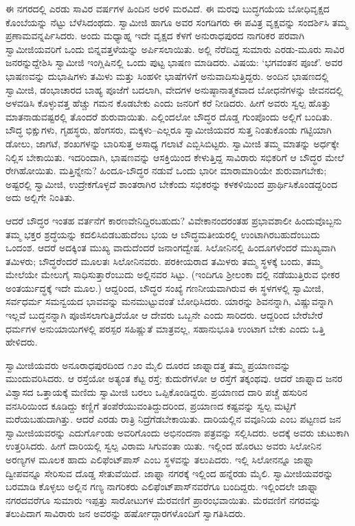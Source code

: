 ಈ ನಗರದಲ್ಲಿ ಎರಡು ಸಾವಿರ ವರ್ಷಗಳ ಹಿಂದಿನ ಅರಳಿ ಮರವಿದೆ. ಈ ಮರವು ಬುದ್ಧಗಯೆಯ ಬೋಧಿವೃಕ್ಷದ ಕೊಂಬೆಯನ್ನು ನೆಟ್ಟು ಬೆಳೆಸಿದಂಥದು. ಸ್ವಾಮೀಜಿ ಹಾಗೂ ಅವರ ಸಂಗಡಿಗರು ಈ ಪವಿತ್ರ ವೃಕ್ಷವನ್ನು ಸಂದರ್ಶಿಸಿ ತಮ್ಮ ಪ್ರಣಾಮವನ್ನರ್ಪಿಸಿದರು. ಅಂದು ಮಧ್ಯಾಹ್ನ ಇದೇ ವೃಕ್ಷದ ಕೆಳಗೆ ಅನುರಾಧಪುರದ ನಾಗರಿಕರ ಪರವಾಗಿ ಸ್ವಾಮೀಜಿಯವರಿಗೆ ಒಂದು ಬಿನ್ನವತ್ತಳೆಯನ್ನು ಅರ್ಪಿಸಲಾಯಿತು. ಅಲ್ಲಿ ನೆರೆದಿದ್ದ ಸುಮಾರು ಎರಡು-ಮೂರು ಸಾವಿರ ಜನರನ್ನುದ್ದೇಶಿಸಿ ಸ್ವಾಮೀಜಿ ಇಂಗ್ಲಿಷಿನಲ್ಲಿ ಒಂದು ಪುಟ್ಟ ಭಾಷಣ ಮಾಡಿದರು. ವಿಷಯ: ‘ಭಗವಂತನ ಪೂಜೆ’. ಅವರ ಭಾಷಣವನ್ನು ದುಭಾಷಿಗಳು ತಮಿಳು ಮತ್ತು ಸಿಂಹಳೀ ಭಾಷೆಗಳಿಗೆ ಅನುವಾದಿಸುತ್ತಿದ್ದರು. ಅಂದಿನ ಭಾಷಣದಲ್ಲಿ ಸ್ವಾಮೀಜಿ, ಡಂಭಾಚಾರದ ಬಾಹ್ಯ ಪೂಜೆಗೆ ಬದಲಾಗಿ, ವೇದಗಳ ಅನುಷ್ಠಾನಾತ್ಮಕವಾದ ಬೋಧನೆಗಳನ್ನು ಜೀವನದಲ್ಲಿ ಅಳವಡಿಸಿ ಕೊಳ್ಳುವತ್ತ ಹೆಚ್ಚು ಗಮನ ಕೊಡಬೇಕು ಎಂದು ಜನರಿಗೆ ಕರೆ ನೀಡಿದರು. ಹೀಗೆ ಅವರು ಸ್ವಲ್ಪ ಹೊತ್ತು ಮಾತನಾಡುವಷ್ಟರಲ್ಲಿ ತೊಂದರೆ ಶುರುವಾಯಿತು. ಎಲ್ಲಿಂದಲೋ ಬೌದ್ಧರ ದೊಡ್ಡ ಗುಂಪೊಂದು ಅಲ್ಲಿಗೆ ಬಂದಿತು. ಬೌದ್ಧ ಭಿಕ್ಷುಗಳು, ಗೃಹಸ್ಥರು, ಹೆಂಗಸರು, ಮಕ್ಕಳು–ಎಲ್ಲರೂ ಸ್ವಾಮೀಜಿಯವರ ಸುತ್ತ ನಿಂತುಕೊಂಡು ಗಟ್ಟಿಯಾಗಿ ಡೋಲು, ಜಾಗಟೆ, ಶಂಖಗಳನ್ನು ಬಾರಿಸುತ್ತ ಅಸಾಧ್ಯ ಗಲಾಟೆ ಎಬ್ಬಿಸಿಬಿಟ್ಟರು. ಸ್ವಾಮೀಜಿ ತಮ್ಮ ಮಾತನ್ನು ಅರ್ಧಕ್ಕೇ ನಿಲ್ಲಿಸ ಬೇಕಾಯಿತು. ಇದರಿಂದಾಗಿ, ಭಾಷಣವನ್ನು ಆಸಕ್ತಿಯಿಂದ ಕೇಳುತ್ತಿದ್ದ ಸಾವಿರಾರು ಸಭಿಕರಿಗೆ ಆ ಬೌದ್ಧರ ಮೇಲೆ ರೇಗಿಹೋಯಿತು. ಮತ್ತಿನ್ನೇನು? ಹಿಂದೂ-ಬೌದ್ಧರ ನಡುವೆ ಒಂದು ಭಾರೀ ಮಾರಾಮಾರಿಯೇ ಶುರುವಾಗಬೇಕು; ಅಷ್ಟರಲ್ಲಿ ಸ್ವಾಮೀಜಿ, ಉದ್ರೇಕಗೊಳ್ಳದೆ ಶಾಂತರಾಗಿರ ಬೇಕೆಂದು ಸಭಿಕರನ್ನು ಕಳಕಳಿಯಿಂದ ಪ್ರಾರ್ಥಿಸಿಕೊಂಡದ್ದರಿಂದ ಅದು ಅಲ್ಲಿಗೇ ನಿಂತಿತು. 

ಆದರೆ ಬೌದ್ಧರ ಇಂತಹ ವರ್ತನೆಗೆ ಕಾರಣವೇನಿದ್ದಿರಬಹುದು? ವಿವೇಕಾನಂದರಂತಹ ಪ್ರಭಾವಶಾಲೀ ಹಿಂದುವೊಬ್ಬನು ತಮ್ಮ ಭಕ್ತರ ಶ್ರದ್ಧೆಯನ್ನು ಕದಲಿಸಿಬಿಡಬಹುದೆಂಬ ಭಯ ಆ ಬೌದ್ಧಮತೀಯರಲ್ಲಿ ಉಂಟಾಗಿರಬಹುದೆಂಬುದು ಒಂದಂಶ. ಆದರೆ ಅದಕ್ಕಿಂತ ಮುಖ್ಯ ವಾದುದೆಂದರೆ ಜನಾಂಗದ್ವೇಷ. ಸಿಲೋನಿನಲ್ಲಿ ಹಿಂದೂಗಳೆಂದರೆ ಮುಖ್ಯವಾಗಿ ತಮಿಳರು; ಬೌದ್ಧರೆಂದರೆ ಮೂಲತಃ ಸಿಲೋನಿನವರು. ಪರಕೀಯರಾದ ತಮಿಳರು ತಮ್ಮ ಸ್ಥಳಕ್ಕೆ ಬಂದು, ತಮ್ಮ ಮೇಲೆಯೇ ಮೇಲುಗೈ ಸಾಧಿಸುತ್ತಾರೆಂಬುದು ಅಲ್ಲಿನವರ ಸಿಟ್ಟು. (ಇಂದಿಗೂ ಶ್ರೀಲಂಕಾ ದಲ್ಲಿ ನಡೆಯುತ್ತಿರುವ ಭೀಕರ ಅಂತರ್ಯುದ್ಧಕ್ಕೆ ಇದೇ ಮೂಲ.) ಆದ್ದರಿಂದ, ಬೌದ್ಧರ ಸಂಖ್ಯೆ ಗಣನೀಯವಾಗಿರುವ ಈ ಸ್ಥಳಗಳಲ್ಲಿ ಸ್ವಾಮೀಜಿ, ಸರ್ವಧರ್ಮ ಸಮನ್ವಯದ ಭಾವವನ್ನು ಮನಮುಟ್ಟುವಂತೆ ಬೋಧಿಸಿದರು. ಯಾರನ್ನು ಶಿವನನ್ನಾಗಿ, ವಿಷ್ಣುವನ್ನಾಗಿ ಇಲ್ಲವೆ ಬುದ್ಧನನ್ನಾಗಿ ಪೂಜಿಸಲಾಗುತ್ತಿದೆಯೋ ಆ ದೇವರು ಒಬ್ಬನೇ ಎಂದು ಸಾರಿದರು. ಆದ್ದರಿಂದ ಬೇರೆಬೇರೆ ಧರ್ಮಗಳ ಅನುಯಾಯಿಗಳಲ್ಲಿ ಪರಸ್ಪರ ಸಹಿಷ್ಣುತೆ ಮಾತ್ರವಲ್ಲ, ಸಹಾನುಭೂತಿ ಉಂಟಾಗ ಬೇಕು ಎಂದು ಒತ್ತಿ ಹೇಳಿದರು. 

ಸ್ವಾಮೀಜಿಯವರು ಅನೂರಾಧಪುರದಿಂದ ೧೨ಂ ಮೈಲಿ ದೂರದ ಜಾಫ್ನಾದತ್ತ ತಮ್ಮ ಪ್ರಯಾಣವನ್ನು ಮುಂದುವರಿಸಿದರು. ಆ ರಸ್ತೆಯೋ ಅತ್ಯಂತ ಕೆಟ್ಟ ರಸ್ತೆ; ಕುದುರೆಗಳೋ ಆ ರಸ್ತೆಗೆ ತಕ್ಕಂಥವು. ಆದರೆ ಜಾಫ್ನಾದ ಜನರ ವಿಶ್ವಾಸದ ಒತ್ತಾಯಕ್ಕೆ ಮಣಿದು ಸ್ವಾಮೀಜಿ ಬರಲು ಒಪ್ಪಿಕೊಂಡಿದ್ದರು. ಪ್ರಯಾಣದ ದಾರಿ ಪಚ್ಚೆ ಹಸುರಿನ ವನಸಿರಿಯಿಂದ ಕೂಡಿದ್ದು ಕಣ್ಣಿಗೆ ತಂಪೆರೆಯುವಂತಿದ್ದುದರಿಂದ, ಪ್ರಯಾಣದ ಕಷ್ಟವನ್ನು ಸ್ವಲ್ಪ ಮಟ್ಟಿಗೆ ಮರೆಯಬಹುದಾಗಿತ್ತು. ಆದರೆ ಎರಡು ರಾತ್ರಿ ನಿದ್ರೆಗೆಡಬೇಕಾಯಿತು. ದಾರಿಯಲ್ಲಿನ ವವೂನಿಯ ಎಂಬ ಪಟ್ಟಣದ ಜನ ಸ್ವಾಮೀಜಿಯವರನ್ನು ಎದುರ್ಗೊಂಡು ಅವರಿಗೊಂದು ಅಭಿನಂದನಾ ಪತ್ರವನ್ನು ಸಲ್ಲಿಸಿದರು. ಅದಕ್ಕೆ ಅವರು ಚುಟುಕಾಗಿ ಉತ್ತರಿಸಿದರು. ಹೀಗೆ ದಾರಿಯಲ್ಲಿ ಸ್ವಲ್ಪ ವಿರಾಮ ಸಿಗುವಂತಾ ಯಿತು. ಇಲ್ಲಿಂದ ಹೊರಟು ಅವರು ಸಿಲೋನಿನ ಅರಣ್ಯಗಳ ಮೂಲಕ ಹಾದು ಎಲಿಫೆಂಟ್​ಪಾಸ್ ಎಂಬ ಸ್ಥಳವನ್ನು ತಲುಪಿದರು. ಇಲ್ಲಿ ಸಿಲೋನನ್ನೂ ಜಾಫ್ನಾ ದ್ವೀಪವನ್ನೂ ಸೇರಿಸುವ ದೊಡ್ಡ ಸೇತುವೆಯಿದೆ. ಜಾಫ್ನಾ ನಗರಕ್ಕೆ ಇಲ್ಲಿಂದ ಹನ್ನೆರಡು ಮೈಲಿ. ಸ್ವಾಮೀಜಿಯವರನ್ನು ಬರಮಾಡಿ ಕೊಳ್ಳಲು ಅಲ್ಲಿನ ಗಣ್ಯ ನಾಗರಿಕರು ಎಲಿಫೆಂಟ್​ಪಾಸ್​ನವರೆಗೂ ಬಂದಿದ್ದರು. ಇಲ್ಲಿಂದಲೇ ಜಾಫ್ನಾ ನಗರದವರೆಗೂ ಸುಮಾರು ಇಪ್ಪತ್ತು ಸಾರೋಟುಗಳ ಮೆರವಣಿಗೆ ಪ್ರಾರಂಭವಾಯಿತು. ಮೆರವಣಿಗೆ ನಗರವನ್ನು ತಲುಪಿದಾಗ ಸಾವಿರಾರು ಜನ ಅವರನ್ನು ಹರ್ಷೋದ್ಗಾರಗಳೊಂದಿಗೆ ಸ್ವಾಗತಿಸಿದರು. 

